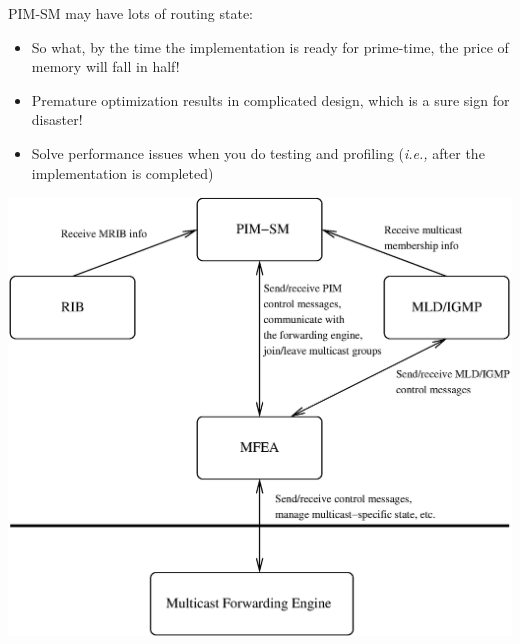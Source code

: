 \documentclass[landscape]{icsislides}
\newcommand{\ie}{\emph{i.e.,}\xspace}
\begin{document}
\begin{slide}

PIM-SM may have lots of routing state:

\begin{itemize}
  \item So what, by the time the implementation is ready for prime-time, the
  price of memory will fall in half!

  \item Premature optimization results in complicated design, which is a sure
  sign for disaster!

  \item Solve performance issues when you do testing and profiling (\ie after
  the implementation is completed)

\end{itemize}

\end{slide}

\begin{slide}

\begin{center}
  \includegraphics[width=6.0in]{figs/pim_other_modules_interaction}
\end{center}


\end{slide}
\end{document}

